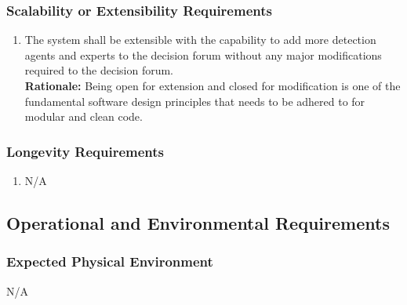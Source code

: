 \documentclass[]{article}
\begin{document}
\begin{enumerate}[{\bf BE1.}]
\subsubsection{Scalability or Extensibility Requirements}
\label{ssub:scalability_or_extensibility_requirements}
\begin{enumerate}[{PR-SE}1. ]
	\item The system shall be extensible with the capability to add more detection agents and experts to the decision forum without any major modifications required to the decision forum.\\
	\textbf{Rationale:} Being open for extension and closed for modification is one of the fundamental software design principles that needs to be adhered to for modular and clean code. 
\end{enumerate}

\subsubsection{Longevity Requirements}
\label{ssub:longevity_requirements}
\begin{enumerate}[{PR-L}1. ]
	\item N/A
\end{enumerate}


\subsection{Operational and Environmental Requirements}
\label{sub:operational_and_environmental_requirements}

\subsubsection{Expected Physical Environment}
\label{ssub:expected_physical_environment}
\hspace{1.5cm}     N/A 


\end{enumerate}
\end{document}
